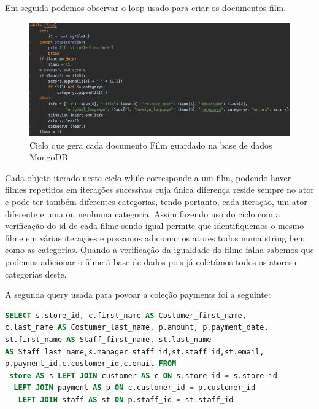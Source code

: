 \par Em seguida podemos observar o loop usado para criar os documentos film.\newline
\begin{figure}[H]

  \centering

  \includegraphics[scale = 0.45]{ciclo.png}

  \caption {Ciclo que gera cada documento Film guardado na base de dados MongoDB}

  \label {fig1}

\end{figure}

Cada objeto iterado neste ciclo while corresponde a um film, podendo haver filmes repetidos em iterações sucessivas cuja única diferença reside sempre no ator e pode ter também diferentes categorias, tendo portanto, cada iteração, um ator diferente e uma ou nenhuma categoria. Assim fazendo uso do ciclo com a verificação do id de cada filme sendo igual permite que identifiquemos o mesmo filme em várias iterações e possamos adicionar os atores todos numa string bem como as categorias. Quando a verificação da igualdade do filme falha sabemos que podemos adicionar o filme á base de dados pois já coletámos todos os atores e categorias deste.

A segunda query usada para povoar a coleção payments foi a seguinte:

\begin{lstlisting}[language=sql,caption=Query para povoar a segunda coleção]
SELECT s.store_id, c.first_name AS Costumer_first_name,
c.last_name AS Costumer_last_name, p.amount, p.payment_date, 
st.first_name AS Staff_first_name, st.last_name  
AS Staff_last_name,s.manager_staff_id,st.staff_id,st.email,
p.payment_id,c.customer_id,c.email FROM 
 store AS s LEFT JOIN customer AS c ON s.store_id = s.store_id 
  LEFT JOIN payment AS p ON c.customer_id = p.customer_id 
   LEFT JOIN staff AS st ON p.staff_id = st.staff_id
\end{lstlisting}

